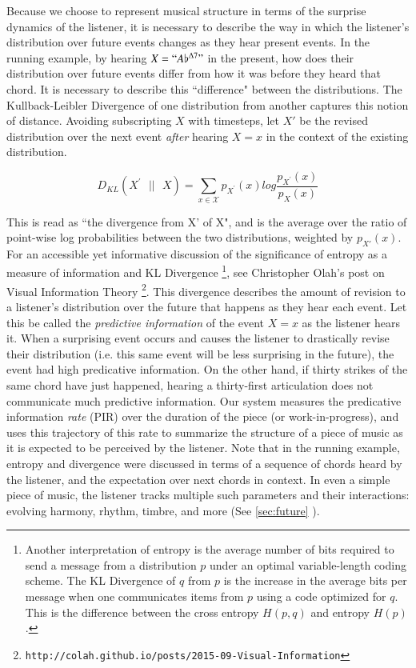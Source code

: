 \documentclass[final,authoryear,5p,times,twocolumn]{elsarticle}
\begin{document}
Because we choose to represent musical structure in terms of the surprise dynamics of the listener, it is necessary to describe the way in which the listener's distribution over future events changes as they hear present events. In the running example, by hearing $X=``A\flat^{\Delta7}"$ in the present, how does their distribution over future events differ from how it was before they heard that chord. It is necessary to describe this ``difference" between the distributions. The Kullback-Leibler Divergence of one distribution from another captures this notion of distance. Avoiding subscripting $X$ with timesteps, let  $X'$ be the revised distribution over the next event \textit{after} hearing $X=x$ in the context of the existing distribution.

$$ D_{KL}(X^{\prime}\textrm{ }|| \textrm{ } X) =  \sum_{x \in \mathcal{X}} p_{X^{\prime}}(x) log\frac{p_{X^{\prime}}(x) }{p_{X}(x)}$$

\noindent This is read as ``the divergence from X' of X", and is the average over the ratio of point-wise log probabilities between the two distributions, weighted by $p_{X'}(x)$. For an accessible yet informative discussion of the significance of entropy as a measure of information and KL Divergence  \footnote{Another interpretation of entropy is the average number of bits required to send a message from a distribution $p$ under an optimal variable-length coding scheme. The KL Divergence of $q$ from $p$ is the increase in the average bits per message when one communicates items from $p$ using a code optimized for $q$. This is the difference between the cross entropy $H(p,q)$ and entropy $H(p)$.}, see Christopher Olah's post on Visual Information Theory \footnote{\texttt{http://colah.github.io/posts/2015-09-Visual-Information}}. This divergence describes the amount of revision to a listener's distribution over the future that happens as they hear each event. Let this be called the \textit{predictive information} of the event $X=x$ as the listener hears it. When a surprising event occurs and causes the listener to drastically revise their distribution (i.e. this same event will be less surprising in the future), the event had high predicative information. On the other hand, if thirty strikes of the same chord have just happened, hearing a thirty-first articulation does not communicate much predictive information. Our system measures the predicative information \textit{rate} (PIR) over the duration of the piece (or work-in-progress), and uses this trajectory of this rate to summarize the structure of a piece of music as it is expected to be perceived by the listener. Note that in the running example, entropy and divergence were discussed in terms of a sequence of chords heard by the listener, and the expectation over next chords in context. In even a simple piece of music, the listener tracks multiple such parameters and their interactions: evolving harmony, rhythm, timbre, and more (See \ref{sec:future} ).
\end{document}
